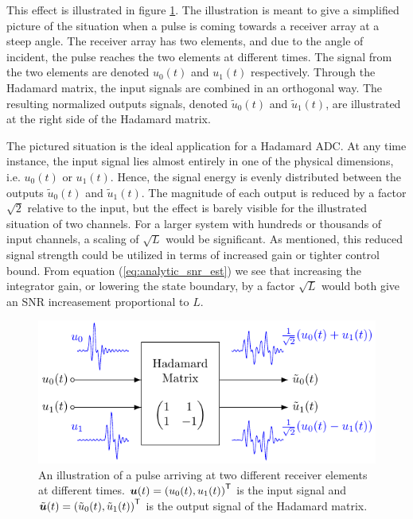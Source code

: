 This effect is illustrated in figure \ref{fig:signal_dimension}. The illustration is meant to give a simplified picture of the situation when a pulse is coming towards a receiver array at a steep angle. The receiver array has two elements, and due to the angle of incident, the pulse reaches the two elements at different times. The signal from the two elements are denoted $u_0(t)$ and $u_1(t)$ respectively. Through the Hadamard matrix, the input signals are combined in an orthogonal way. The resulting normalized outputs signals, denoted $\tilde{u}_0(t)$ and $\tilde{u}_1(t)$, are illustrated at the right side of the Hadamard matrix.

The pictured situation is the ideal application for a Hadamard ADC. At any time instance, the input signal lies almost entirely in one of the physical dimensions, i.e. $u_0(t)$ or $u_1(t)$. Hence, the signal energy is evenly distributed between the outputs $\tilde{u}_0(t)$ and $\tilde{u}_1(t)$. The magnitude of each output is reduced by a factor $\sqrt{2}$ relative to the input, but the effect is barely visible for the illustrated situation of two channels. For a larger system with hundreds or thousands of input channels, a scaling of $\sqrt{L}$ would be significant. As mentioned, this reduced signal strength could be utilized in terms of increased gain or tighter control bound. From equation (\ref{eq:analytic_snr_est}) we see that increasing the integrator gain, or lowering the state boundary, by a factor $\sqrt{L}$ would both give an SNR increasement proportional to $L$.
\begin{figure}[htbp]
    \centering
    \includegraphics[width=\linewidth]{figures/05hadamard/signal_dimension.pdf}
    \caption{An illustration of a pulse arriving at two different receiver elements at different times. $\bm{u}(t) = \left( u_0(t) , u_1(t) \right)^\mathsf{T}$ is the input signal and $\tilde{\bm{u}}(t) = \left( \tilde{u}_0(t) , \tilde{u}_1(t) \right)^\mathsf{T}$ is the output signal of the Hadamard matrix.}
    \label{fig:signal_dimension}
\end{figure}


